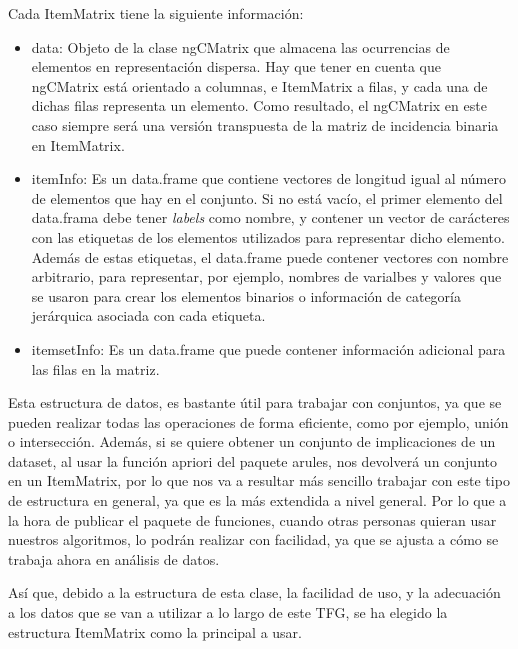 Cada ItemMatrix tiene la siguiente informaci\'on:
\begin{itemize}

\item data:
Objeto de la clase ngCMatrix que almacena las ocurrencias de elementos en 
representaci\'on dispersa. Hay que tener en cuenta que ngCMatrix est\'a orientado 
a columnas, e ItemMatrix a filas, y cada una de dichas filas representa un elemento.
Como resultado, el ngCMatrix en este caso siempre ser\'a una versi\'on transpuesta 
de la matriz de incidencia binaria en ItemMatrix.


\item itemInfo:
Es un data.frame que contiene vectores de longitud igual al n\'umero de elementos que 
hay en el conjunto. Si no est\'a vac\'io, el primer elemento del data.frama debe tener 
\textit{labels} como nombre, y contener un vector de car\'acteres con las etiquetas de los 
elementos utilizados para representar dicho elemento. Adem\'as de estas etiquetas, el 
data.frame puede contener vectores con nombre arbitrario, para representar, por ejemplo, 
nombres de varialbes y valores que se usaron para crear los elementos binarios o 
informaci\'on de categor\'ia jer\'arquica asociada con cada etiqueta.


\item itemsetInfo:
Es un data.frame que puede contener informaci\'on adicional para las filas en la matriz.

\end{itemize}



Esta estructura de datos, es bastante \'util para trabajar con conjuntos, ya que se pueden 
realizar todas las operaciones de forma eficiente, como por ejemplo, uni\'on o intersecci\'on.
Adem\'as, si se quiere obtener un conjunto de implicaciones de un dataset, al usar la funci\'on 
apriori del paquete arules, nos devolver\'a un conjunto en un ItemMatrix, por lo que nos va a 
resultar m\'as sencillo trabajar con este tipo de estructura en general, ya que es la m\'as 
extendida a nivel general. Por lo que a la hora de publicar el paquete de funciones, cuando otras 
personas quieran usar nuestros algoritmos, lo podr\'an realizar con facilidad, ya que se ajusta 
a c\'omo se trabaja ahora en an\'alisis de datos.

As\'i que, debido a la estructura de esta clase, la facilidad de uso, y la adecuaci\'on a 
los datos que se van a utilizar a lo largo de este TFG, se ha elegido la estructura ItemMatrix 
como la principal a usar. 















